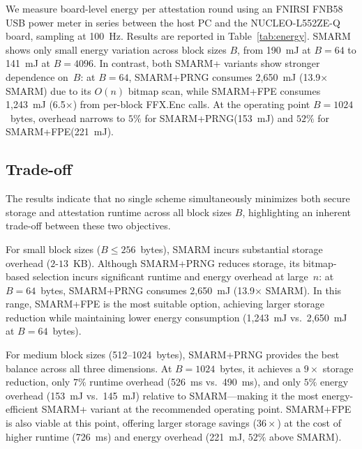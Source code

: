 \documentclass{ieeeaccess}
\newcommand{\rtsmarm}{SMARM+\xspace}
\newcommand{\rtsmarmone}{SMARM+PRNG\xspace}
\newcommand{\rtsmarmtwo}{SMARM+FPE\xspace}
\begin{document}
We measure board-level energy per attestation round using 
an FNIRSI FNB58 USB power meter in series between the host 
PC and the NUCLEO-L552ZE-Q board, sampling at 100~Hz. 
%
Results are reported in Table~\ref{tab:energy}.
SMARM shows only small energy variation across block sizes $B$, from 190~mJ at $B=64$ to 141~mJ at $B=4096$.
In contrast, both \rtsmarm variants show stronger dependence on~$B$: 
at $B = 64$, \rtsmarmone consumes 2{,}650~mJ 
(13.9$\times$ SMARM) due to its $O(n)$ bitmap scan, 
while \rtsmarmtwo consumes 1{,}243~mJ (6.5$\times$) 
from per-block \textsf{FFX.Enc} calls.
At the operating point $B = 1024$~bytes, overhead 
narrows to $5\%$ for \rtsmarmone (153~mJ) and 
$52\%$ for \rtsmarmtwo (221~mJ).

\subsection{Trade-off}
The results indicate that no single scheme simultaneously minimizes both secure storage and attestation runtime across all block sizes $B$, highlighting an inherent trade-off between these two objectives.

For small block sizes ($B \leq 256$~bytes), SMARM incurs 
substantial storage overhead ($2$-$13$~KB). Although 
\rtsmarmone reduces storage, its bitmap-based selection 
incurs significant runtime and energy overhead at large~$n$: 
at $B = 64$~bytes, \rtsmarmone consumes 2{,}650~mJ 
(13.9$\times$ SMARM). In this range, \rtsmarmtwo is the 
most suitable option, achieving larger storage reduction 
while maintaining lower energy consumption (1{,}243~mJ 
vs.\ 2{,}650~mJ at $B = 64$~bytes).

For medium block sizes (512--1024~bytes), \rtsmarmone 
provides the best balance across all three dimensions. 
At $B = 1024$~bytes, it achieves a $9\times$ storage 
reduction, only $7\%$ runtime overhead (526~ms vs.\ 
490~ms), and only $5\%$ energy overhead (153~mJ vs.\ 
145~mJ) relative to SMARM---making it the most 
energy-efficient \rtsmarm variant at the recommended 
operating point.
\rtsmarmtwo is also viable at this point, offering larger 
storage savings ($36\times$) at the cost of higher runtime 
(726~ms) and energy overhead (221~mJ, $52\%$ above SMARM).
\end{document}
